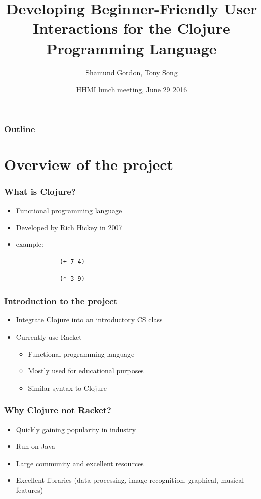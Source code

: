 \documentclass{beamer}
\begin{document}
\title{Developing Beginner-Friendly User Interactions for the Clojure Programming Language}
\author{Shamund Gordon, Tony Song}
\date[]  
{HHMI lunch meeting, June 29 2016}

\begin{frame}
  \titlepage
\end{frame}


\begin{frame}

\frametitle{Outline}
\tableofcontents
\end{frame}

\section{Overview of the project}

\begin{frame}[fragile]
	\frametitle{What is Clojure?}
	\begin{itemize}
		\item Functional programming language
		\item Developed by Rich Hickey in 2007
		\item example: 
		\begin{verbatim}
			(+ 7 4)
		\end{verbatim}
		\begin{verbatim}
			(* 3 9)
		\end{verbatim}
	\end{itemize}
\end{frame}


\begin{frame}
	\frametitle{Introduction to the project}
	\begin{itemize}
		\item Integrate Clojure into an introductory CS class
		\item Currently use Racket
		\begin{itemize}
		\item Functional programming language
		\item Mostly used for educational purposes
		\item Similar syntax to Clojure
		\end{itemize}
	\end{itemize}
\end{frame}

\begin{frame}
	\frametitle{Why Clojure not Racket?}
	\begin{itemize}
		\item Quickly gaining popularity in industry
		\item Run on Java
		\item Large community and excellent resources
		\item Excellent libraries (data processing, image recognition, graphical, musical features)
	\end{itemize}
\end{frame}
\end{document}
